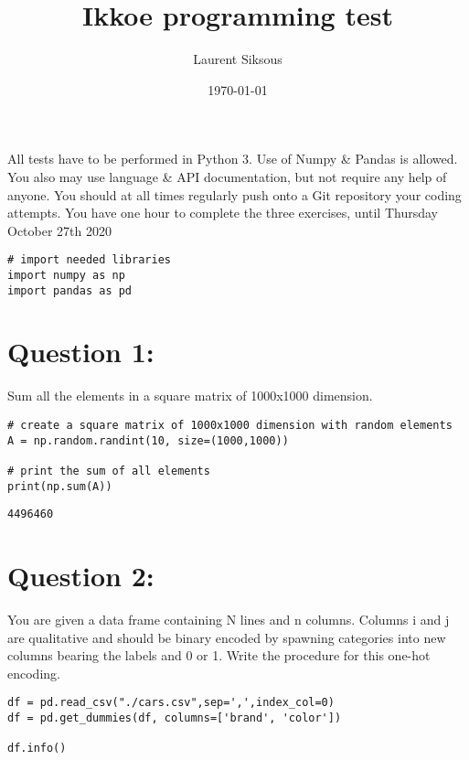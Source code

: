 \documentclass[11pt]{article}
\author{Laurent Siksous}
\date{\today}
\title{Ikkoe programming test}
\begin{document}
\maketitle
All tests have to be performed in Python 3. Use of Numpy \& Pandas is allowed. You also may use 
language \& API documentation, but not require any help of anyone.
You should at all times regularly push onto a Git repository your coding attempts.
You have one hour to complete the three exercises, until Thursday October 27th 2020

\begin{verbatim}
# import needed libraries
import numpy as np
import pandas as pd 
\end{verbatim}

\section{Question 1:}
\label{sec:orga056a75}
Sum all the elements in a square matrix of 1000x1000 dimension.

\begin{verbatim}
# create a square matrix of 1000x1000 dimension with random elements
A = np.random.randint(10, size=(1000,1000))

# print the sum of all elements
print(np.sum(A))
\end{verbatim}

\begin{verbatim}
4496460
\end{verbatim}

\section{Question 2:}
\label{sec:org7e29dfa}
You are given a data frame containing N lines and n columns. Columns i and j are qualitative and 
should be binary encoded by spawning categories into new columns bearing the labels and 0 or 1. 
Write the procedure for this one-hot encoding.

\begin{verbatim}
df = pd.read_csv("./cars.csv",sep=',',index_col=0)
df = pd.get_dummies(df, columns=['brand', 'color'])

df.info()
\end{verbatim}
\end{document}
